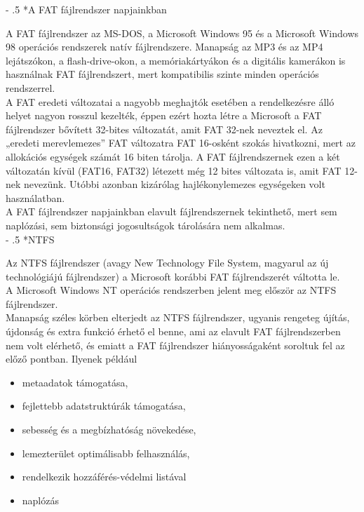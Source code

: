\documentclass[tikz,12pt,margin=0px]{article}
\makeatletter
\renewcommand\paragraph{%
	\@startsection{paragraph}{4}{0mm}%
	{-\baselineskip}%
	{.5\baselineskip}%
	{\normalfont\normalsize\bfseries}}
\makeatother
\begin{document}
    \paragraph*{A FAT fájlrendszer napjainkban}

    \noindent A FAT fájlrendszer az MS-DOS, a Microsoft Windows 95 és a Microsoft Windows 98 operációs rendszerek natív fájlrendszere. Manapság az MP3 és az MP4 lejátszókon, a flash-drive-okon, a memóriakártyákon és a digitális kamerákon is használnak FAT fájlrendszert, mert kompatibilis szinte minden operációs rendszerrel.\\

    \noindent A FAT eredeti változatai a nagyobb meghajtók esetében a rendelkezésre álló helyet nagyon rosszul kezelték, éppen ezért hozta létre a Microsoft a FAT fájlrendszer bővített 32-bites változatát, amit FAT 32-nek neveztek el. Az „eredeti merevlemezes” FAT változatra FAT 16-osként szokás hivatkozni, mert az allokációs egységek számát 16 biten tárolja. A FAT fájlrendszernek ezen a két változatán kívül (FAT16, FAT32) létezett még 12 bites változata is, amit FAT 12-nek nevezünk. Utóbbi azonban kizárólag hajlékonylemezes egységeken volt használatban.\\

    \noindent A FAT fájlrendszer napjainkban elavult fájlrendszernek tekinthető, mert sem naplózási, sem biztonsági jogosultságok tárolására nem alkalmas.\\

	\paragraph*{NTFS}

    \noindent Az NTFS fájlrendszer (avagy New Technology File System, magyarul az új technológiájú fájlrendszer) a Microsoft korábbi FAT fájlrendszerét váltotta le.\\

    \noindent A Microsoft Windows NT operációs rendszerben jelent meg először az NTFS fájlrendszer.\\

    \noindent Manapság széles körben elterjedt az NTFS fájlrendszer, ugyanis rengeteg újítás, újdonság és extra funkció érhető el benne, ami az elavult FAT fájlrendszerben nem volt elérhető, és emiatt a FAT fájlrendszer hiányosságaként soroltuk fel az előző pontban. Ilyenek például
    \begin{itemize}[topsep=8pt,itemsep=4pt,partopsep=4pt, parsep=4pt]
        \item metaadatok támogatása,
        \item fejlettebb adatstruktúrák támogatása,
        \item sebesség és a megbízhatóság növekedése,
        \item lemezterület optimálisabb felhasználás,
        \item rendelkezik hozzáférés-védelmi listával
        \item naplózás
    \end{itemize}
\end{document}
